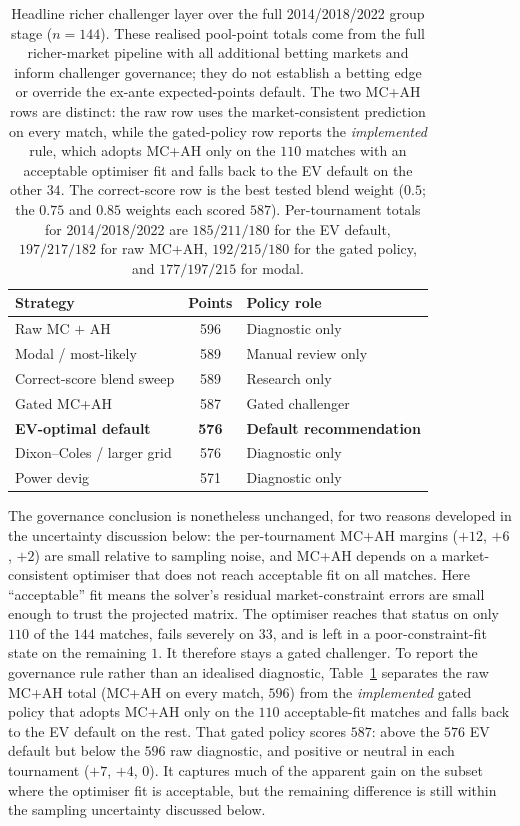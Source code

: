 \documentclass[11pt]{article}
\begin{document}
\begin{table}[htbp]
\centering
\small
\begin{tabular}{l c l}
\toprule
Strategy & Points & Policy role \\
\midrule
Raw MC $+$ AH & 596 & Diagnostic only \\
Modal / most-likely         & 589 & Manual review only \\
Correct-score blend sweep   & 589 & Research only \\
Gated MC+AH          & 587 & Gated challenger \\
\textbf{EV-optimal default}          & \textbf{576} & \textbf{Default recommendation} \\
Dixon--Coles / larger grid  & 576 & Diagnostic only \\
Power devig                 & 571 & Diagnostic only \\
\bottomrule
\end{tabular}
\caption{Headline richer challenger layer over the full 2014/2018/2022 group stage (\(n=144\)).
These realised pool-point totals come from the full richer-market pipeline with all additional
betting markets and inform challenger governance; they do not establish a betting edge or
override the ex-ante expected-points default. The two MC+AH rows are distinct: the raw row uses
the market-consistent prediction on every match, while the gated-policy row reports the
\emph{implemented} rule, which adopts MC+AH only on the $110$ matches with an acceptable
optimiser fit and falls back to the EV default on the other $34$. The correct-score row is the
best tested blend weight (\(0.5\); the \(0.75\) and \(0.85\) weights each scored \(587\)).
Per-tournament totals for 2014/2018/2022 are \(185/211/180\) for the EV default, \(197/217/182\)
for raw MC+AH, \(192/215/180\) for the gated policy, and \(177/197/215\) for modal.}
\label{tab:richer-diagnostics}
\end{table}

The governance conclusion is nonetheless unchanged, for two reasons developed in the
uncertainty discussion below: the per-tournament MC+AH margins ($+12$, $+6$, $+2$) are small
relative to sampling noise, and MC+AH depends on a market-consistent optimiser that does not reach
acceptable fit on all matches. Here ``acceptable'' fit means the solver's residual market-constraint
errors are small enough to trust the projected matrix. The optimiser reaches that status on only
$110$ of the $144$ matches, fails severely on $33$, and is left in a poor-constraint-fit state on
the remaining $1$. It therefore stays a gated challenger. To report the governance rule rather than an idealised
diagnostic, Table~\ref{tab:richer-diagnostics} separates the raw MC+AH total (MC+AH on every
match, $596$) from the \emph{implemented} gated policy that adopts MC+AH only on the $110$
acceptable-fit matches and falls back to the EV default on the rest. That gated policy scores
$587$: above the $576$ EV default but below the $596$ raw diagnostic, and positive or neutral in
each tournament ($+7$, $+4$, $0$). It captures much of the apparent gain on the subset where the
optimiser fit is acceptable, but the remaining difference is still within the sampling uncertainty
discussed below.
\end{document}
